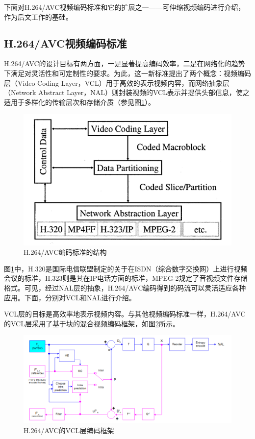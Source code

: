 下面对H.264/AVC视频编码标准和它的扩展之一——可伸缩视频编码进行介绍，作为后文工作的基础。

\subsection{H.264/AVC视频编码标准}

H.264/AVC的设计目标有两方面，一是显著提高编码效率，二是在网络化的趋势下满足对灵活性和可定制性的要求。为此，这一新标准提出了两个概念：视频编码层（Video Coding Layer，VCL）用于高效的表示视频内容，而网络抽象层（Network Abstract Layer，NAL）则封装视频的VCL表示并提供头部信息，使之适用于多样化的传输层次和存储介质（参见图\ref{fig:02}\supercite{H.264-Overview}）。

\begin{figure}[h]
	\centering
	\includegraphics[width = 0.6\linewidth]{clip/02.png}
	\caption{H.264/AVC编码标准的结构\label{fig:02}}
\end{figure}

图\ref{fig:02}中，H.320是国际电信联盟制定的关于在ISDN（综合数字交换网）上进行视频会议的标准，H.323则是其在IP电话方面的标准，MPEG-2规定了音视频文件存储格式。可见，经过NAL层的抽象，H.264/AVC编码得到的码流可以灵活适应各种应用。下面，分别对VCL和NAL进行介绍。

VCL层的目标是高效率地表示视频内容。与其他视频编码标准一样，H.264/AVC的VCL层采用了基于块的混合视频编码框架，如图\ref{fig:03}所示。

\begin{figure}[h]
	\centering
	\includegraphics[width = 1.0\linewidth]{clip/03.png}
	\caption{H.264/AVC的VCL层编码框架\label{fig:03}}
\end{figure}

